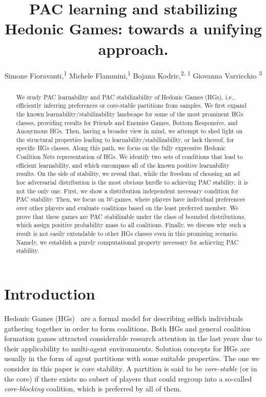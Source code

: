 \documentclass[letterpaper]{article} %
\title{PAC learning and stabilizing Hedonic Games: towards a unifying approach.}
\author {
    Simone Fioravanti,\textsuperscript{\rm 1}
    Michele Flammini,\textsuperscript{\rm 1}
    Bojana Kodric,\textsuperscript{\rm 2, \rm 1}
    Giovanna Varricchio \textsuperscript{\rm 3}
}
\newcommand{\W}{\ensuremath{\mathcal{W}}}
\begin{document}
\maketitle

\begin{abstract}
We study PAC learnability and PAC stabilizability of Hedonic Games (HGs), i.e., efficiently inferring preferences or core-stable partitions from samples.
 We first expand the known learnability/stabilizability landscape for some of the most prominent HGs classes, providing results for Friends and Enemies Games, Bottom Responsive, and Anonymous HGs.
 Then, having a broader view in mind, we attempt to shed light on the structural properties leading to learnability/stabilizability, or lack thereof, for specific HGs classes.
 Along this path, we focus on the fully expressive Hedonic Coalition Nets representation of HGs. We identify two sets of conditions that lead to efficient learnability, and which encompass all of the known positive learnability results.
 On the side of stability, we reveal that, while the freedom of choosing an ad hoc adversarial distribution is the most obvious hurdle to achieving PAC stability, it is not the only one. First, we show a distribution independent necessary condition for PAC stability.
Then, we focus on $\W$-games, where players have individual preferences over other players and evaluate coalitions based on the least preferred member.
We prove that these games are PAC stabilizable under the class of bounded distributions, which assign positive probability mass to all coalitions.
Finally, we discuss why such a result is not easily extendable to other HGs classes even in this promising scenario. Namely, we establish a purely computational property necessary for achieving PAC stability.
\end{abstract}

\section{Introduction}
Hedonic Games (HGs)~\cite{Dreze80} are a formal model for describing selfish individuals gathering together in order to form coalitions. Both HGs and general coalition formation games attracted considerable research attention in the last years due to their applicability to multi-agent environments.
Solution concepts for HGs are usually in the form of agent partitions with some suitable properties. The one we consider in this paper is core stability. A partition is said to be \emph{core-stable} (or in the core) if there exists no subset of players that could regroup into a so-called \emph{core-blocking} coalition, which is preferred by all of them.
\end{document}
